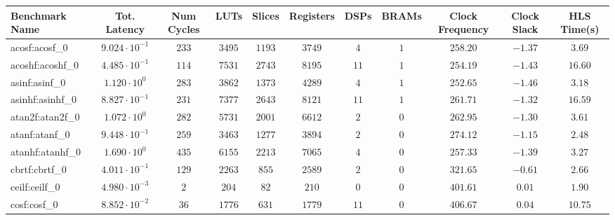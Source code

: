 \begin{tabular}{|l|c|c|c|c|c|c|c|c|c|c|}
\hline
Benchmark Name               & Tot. Latency            & Num Cycles & LUTs       & Slices    & Registers  & DSPs    & BRAMs & Clock Frequency & Clock Slack & HLS Time(s) \\
\hline
acosf:acosf\_0               & $ 9.024 \cdot 10^{-1} $ & $ 233    $ & $ 3495   $ & $ 1193  $ & $ 3749   $ & $ 4   $ & $ 1 $ & $ 258.20      $ & $ -1.37   $ & $ 3.69    $ \\
acoshf:acoshf\_0             & $ 4.485 \cdot 10^{-1} $ & $ 114    $ & $ 7531   $ & $ 2743  $ & $ 8195   $ & $ 11  $ & $ 1 $ & $ 254.19      $ & $ -1.43   $ & $ 16.60   $ \\
asinf:asinf\_0               & $ 1.120 \cdot 10^{0}  $ & $ 283    $ & $ 3862   $ & $ 1373  $ & $ 4289   $ & $ 4   $ & $ 1 $ & $ 252.65      $ & $ -1.46   $ & $ 3.18    $ \\
asinhf:asinhf\_0             & $ 8.827 \cdot 10^{-1} $ & $ 231    $ & $ 7377   $ & $ 2643  $ & $ 8121   $ & $ 11  $ & $ 1 $ & $ 261.71      $ & $ -1.32   $ & $ 16.59   $ \\
atan2f:atan2f\_0             & $ 1.072 \cdot 10^{0}  $ & $ 282    $ & $ 5731   $ & $ 2001  $ & $ 6612   $ & $ 2   $ & $ 0 $ & $ 262.95      $ & $ -1.30   $ & $ 3.61    $ \\
atanf:atanf\_0               & $ 9.448 \cdot 10^{-1} $ & $ 259    $ & $ 3463   $ & $ 1277  $ & $ 3894   $ & $ 2   $ & $ 0 $ & $ 274.12      $ & $ -1.15   $ & $ 2.48    $ \\
atanhf:atanhf\_0             & $ 1.690 \cdot 10^{0}  $ & $ 435    $ & $ 6155   $ & $ 2213  $ & $ 7065   $ & $ 4   $ & $ 0 $ & $ 257.33      $ & $ -1.39   $ & $ 3.27    $ \\
cbrtf:cbrtf\_0               & $ 4.011 \cdot 10^{-1} $ & $ 129    $ & $ 2263   $ & $ 855   $ & $ 2589   $ & $ 2   $ & $ 0 $ & $ 321.65      $ & $ -0.61   $ & $ 2.66    $ \\
ceilf:ceilf\_0               & $ 4.980 \cdot 10^{-3} $ & $ 2      $ & $ 204    $ & $ 82    $ & $ 210    $ & $ 0   $ & $ 0 $ & $ 401.61      $ & $ 0.01    $ & $ 1.90    $ \\
cosf:cosf\_0                 & $ 8.852 \cdot 10^{-2} $ & $ 36     $ & $ 1776   $ & $ 631   $ & $ 1779   $ & $ 11  $ & $ 0 $ & $ 406.67      $ & $ 0.04    $ & $ 10.75   $ \\

\end{tabular}
